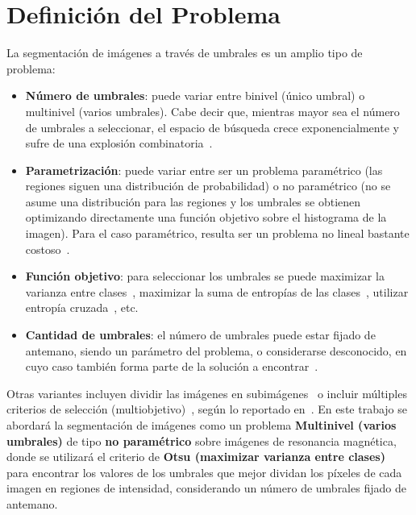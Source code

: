 \documentclass[letter, 10pt]{article}
\begin{document}
\section{Definici\'on del Problema}
La segmentaci\'on de im\'agenes a trav\'es de umbrales es un amplio tipo de problema:
\begin{itemize}
    \item \textbf{N\'umero de umbrales}: puede variar entre binivel (\'unico umbral) o multinivel (varios umbrales). Cabe decir que, mientras mayor sea el n\'umero de umbrales a seleccionar, el espacio de b\'usqueda crece exponencialmente y sufre de una explosi\'on combinatoria~\cite{Hammouche2010Comparative, Manikandan2014Multilevel}.
    \item \textbf{Parametrizaci\'on}: puede variar entre ser un problema param\'etrico (las regiones siguen una distribuci\'on de probabilidad) o no param\'etrico (no se asume una distribuci\'on para las regiones y los umbrales se obtienen optimizando directamente una funci\'on objetivo sobre el histograma de la imagen). Para el caso param\'etrico, resulta ser un problema no lineal bastante costoso~\cite{Hammouche2010Comparative}.
    \item \textbf{Funci\'on objetivo}: para seleccionar los umbrales se puede maximizar la varianza entre clases~\cite{Otsu1979}, maximizar la suma de entrop\'ias de las clases~\cite{Kapur1985, Manikandan2014Multilevel}, utilizar entrop\'ia cruzada~\cite{LiLee1993}, etc.
    \item \textbf{Cantidad de umbrales}: el n\'umero de umbrales puede estar fijado de antemano, siendo un par\'ametro del problema, o considerarse desconocido, en cuyo caso tambi\'en forma parte de la soluci\'on a encontrar~\cite{Hammouche2008Multilevel}.
\end{itemize}

Otras variantes incluyen dividir las im\'agenes en subim\'agenes~\cite{Rahnamayan2006} o incluir m\'ultiples criterios de selecci\'on (multiobjetivo)~\cite{Nakib2007}, seg\'un lo reportado en~\cite{Hammouche2010Comparative}. En este trabajo se abordar\'a la segmentaci\'on de im\'agenes como un problema \textbf{Multinivel (varios umbrales)} de tipo \textbf{no param\'etrico} sobre im\'agenes de resonancia magn\'etica, donde se utilizar\'a el criterio de \textbf{Otsu (maximizar varianza entre clases)}~\cite{Otsu1979} para encontrar los valores de los umbrales que mejor dividan los p\'ixeles de cada imagen en regiones de intensidad, considerando un n\'umero de umbrales fijado de antemano.
\end{document}
